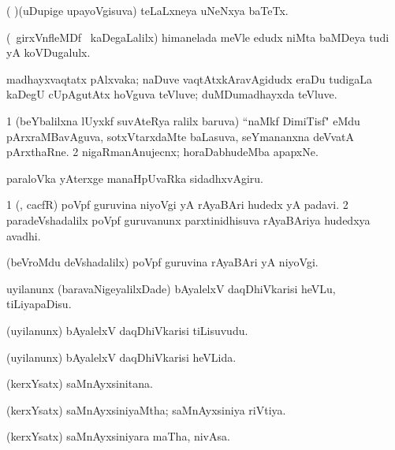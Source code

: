 \noindent
\gl{\pagu}
\bmng
{} ( )(uDupige upayoVgisuva) teLaLxneya uNeNxya baTeTx. 
\emng
\eentry

\bentry
{}
\gl{\nA}
\bmng
(\kanmu\ girxVnfleMDf \mo\ kaDegaLalilx) himanelada meVle edudx niMta baMDeya tudi yA koVDugalulx. 
\emng
\eentry

\bentry
{}
\gl{\nA}
\bmng
madhayxvaqtatx pAlxvaka; naDuve vaqtAtxkAravAgidudx eraDu tudigaLa kaDegU cUpAgutAtx hoVguva teVluve; duMDumadhayxda teVluve. 
\emng
\eentry

\bentry
{}
\gl{\nA}
\expl{\Latin}
\bmng
\bnum
\num{1} (beYbalilxna lUyxkf suvAteRya ralilx baruva) ``naMkf DimiTisf" eMdu pArxraMBavAguva, sotxVtarxdaMte baLasuva, seYmananxna deVvatA pArxthaRne. 
\num{2} nigaRmanAnujecnx; horaDabhudeMba apapxNe. 
\enum
\emng

\noindent
\gl{\pagu}
\bmng
{} paraloVka yAterxge manaHpUvaRka sidadhxvAgiru. 
\emng
\eentry

\bentry
{}
\gl{\nA}
\bmng
\bnum
\num{1} (\roVkAyx, cacfR) poVpf guruvina niyoVgi yA rAyaBAri hudedx yA padavi. 
\num{2} paradeVshadalilx poVpf guruvanunx parxtinidhisuva rAyaBAriya hudedxya avadhi. 
\enum
\emng
\eentry

\bentry
{}
\gl{\nA}
\bmng
(beVroMdu deVshadalilx) poVpf guruvina rAyaBAri yA niyoVgi. 
\emng
\eentry

\bentry
{}
\gl{\sakirx}
\bmng
uyilanunx (baravaNigeyalilxDade) bAyalelxV daqDhiVkarisi heVLu, tiLiyapaDisu. 
\emng
\eentry

\bentry
{}
\gl{\nA}
\bmng
(uyilanunx) bAyalelxV daqDhiVkarisi tiLisuvudu. 
\emng
\eentry

\bentry
{}
\gl{\gu}
\bmng
(uyilanunx) bAyalelxV daqDhiVkarisi heVLida. 
\emng
\eentry

\bentry
{}
\gl{\nA}
\bmng
(kerxYsatx) saMnAyxsinitana. 
\emng
\eentry

\bentry
{}
\gl{\gu}
\bmng
(kerxYsatx) saMnAyxsiniyaMtha; saMnAyxsiniya riVtiya. 
\emng
\eentry

\bentry
{}
\gl{\nA}
\bmng
(kerxYsatx) saMnAyxsiniyara maTha, nivAsa. 
\emng
\eentry

